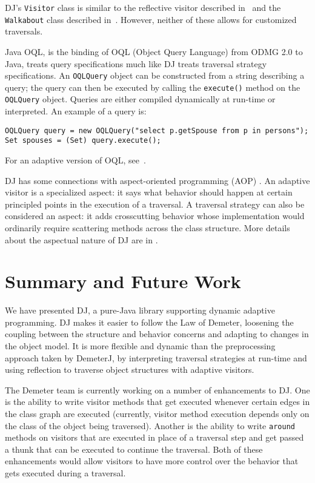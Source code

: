 \documentclass{llncs}
\newcommand{\code}[1]{\texttt{#1}}
\begin{document}
DJ's \code{Visitor} class is similar to the reflective visitor
described in~\cite{java-tip:reflective-visitor} and the
\code{Walkabout} class described in~\cite{palsberg:jay}.  However,
neither of these allows for customized traversals.

Java OQL, is the binding of OQL (Object Query Language) from ODMG 2.0
\cite{cattell:odmg2.0} to Java, treats query specifications much like
DJ treats traversal strategy specifications.  An \code{OQLQuery}
object can be constructed from a string describing a query; the query
can then be executed by calling the \code{execute()} method on the
\code{OQLQuery} object.  Queries are either compiled dynamically at
run-time or interpreted.  An example of a query is:
\begin{verbatim}
OQLQuery query = new OQLQuery("select p.getSpouse from p in persons");
Set spouses = (Set) query.execute();
\end{verbatim}
For an adaptive version of OQL, see~\cite{harrison:aql-94}.

DJ has some connections with aspect-oriented programming (AOP)
\cite{aop:ecoop97}.  An adaptive visitor is a specialized aspect: it
says what behavior should happen at certain principled points in the
execution of a traversal.  A traversal strategy can also be considered
an aspect: it adds crosscutting behavior whose implementation would
ordinarily require scattering methods across the class structure.
More details about the aspectual nature of DJ are in
\cite{aspectual-methods}.

\section{Summary and Future Work}

We have presented DJ, a pure-Java library supporting dynamic adaptive
programming.  DJ makes it easier to follow the Law of Demeter,
loosening the coupling between the structure and behavior concerns and
adapting to changes in the object model.  It is more flexible and
dynamic than the preprocessing approach taken by DemeterJ, by
interpreting traversal strategies at run-time and using reflection to
traverse object structures with adaptive visitors.

The Demeter team is currently working on a number of enhancements to
DJ.  One is the ability to write visitor methods that get executed
whenever certain edges in the class graph are executed (currently,
visitor method execution depends only on the class of the object being
traversed).  Another is the ability to write \code{around} methods on
visitors that are executed in place of a traversal step and get passed
a thunk that can be executed to continue the traversal.  Both of these
enhancements would allow visitors to have more control over the
behavior that gets executed during a traversal.
\end{document}
